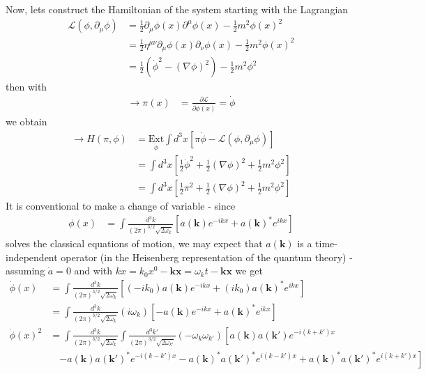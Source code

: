 \documentclass{article}
\begin{document}
Now, lets construct the Hamiltonian of the system starting with the Lagrangian
\begin{align}
\mathcal{L}(\phi,\partial_\mu\phi)
&=\frac{1}{2}\partial_\mu\phi(x)\partial^\mu\phi(x)-\frac{1}{2}m^2\phi(x)^2\\
&=\frac{1}{2}\eta^{\mu\nu}\partial_\mu\phi(x)\partial_\nu\phi(x)-\frac{1}{2}m^2\phi(x)^2\\
&=\frac{1}{2}\left(\dot{\phi}^2-(\nabla\phi)^2\right)-\frac{1}{2}m^2\phi^2
\end{align}
then with
\begin{align}
\rightarrow\pi(x)&=\frac{\partial \mathcal{L}}{\partial \dot{\phi}(x)}=\dot{\phi}
\end{align}
we obtain
\begin{align}
\rightarrow H(\pi,\phi)&=\underset{\dot{\phi}}{\text{Ext}}\int d^3x\left[\pi\dot{\phi}-\mathcal{L}(\phi,\partial_\mu\phi)\right]\\
&=\int d^3x\left[\frac{1}{2}\dot{\phi}^2+\frac{1}{2}(\nabla\phi)^2+\frac{1}{2}m^2\phi^2\right]\\
&=\int d^3x\left[\frac{1}{2}\pi^2+\frac{1}{2}(\nabla\phi)^2+\frac{1}{2}m^2\phi^2\right]
\end{align}
It is conventional to make a change of variable - since
\begin{align}
\phi(x)
&=\int\frac{d^3k}{(2\pi)^{3/2}\sqrt{2\omega_k}}\left[a(\mathbf{k})e^{-ikx}+a(\mathbf{k})^*e^{ikx}\right]
\end{align} 
solves the classical equations of motion, we may expect that $a(\mathbf{k})$ is a time-independent operator (in the Heisenberg representation of the quantum theory) - assuming $\dot{a}=0$ and with $kx=k_0x^0-\mathbf{kx}=\omega_kt-\mathbf{kx}$ we get
\begin{align}
\dot{\phi}(x)
&=\int\frac{d^3k}{(2\pi)^{3/2}\sqrt{2\omega_k}}\left[(-ik_0)a(\mathbf{k})e^{-ikx}+(ik_0)a(\mathbf{k})^*e^{ikx}\right]\\
&=\int\frac{d^3k}{(2\pi)^{3/2}\sqrt{2\omega_k}}(i\omega_k)\left[-a(\mathbf{k})e^{-ikx}+a(\mathbf{k})^*e^{ikx}\right]\\
\dot{\phi}(x)^2
&=\int\frac{d^3k}{(2\pi)^{3/2}\sqrt{2\omega_k}}\int\frac{d^3k'}{(2\pi)^{3/2}\sqrt{2\omega_{k'}}}(-\omega_k\omega_{k'})\left[a(\mathbf{k})a(\mathbf{k}')e^{-i(k+k')x}\right.\\
&\quad \left.-a(\mathbf{k})a(\mathbf{k}')^*e^{-i(k-k')x}-a(\mathbf{k})^*a(\mathbf{k}')^*e^{i(k-k')x}+a(\mathbf{k})^*a(\mathbf{k}')^*e^{i(k+k')x}\right]
\end{align}
\end{document}
